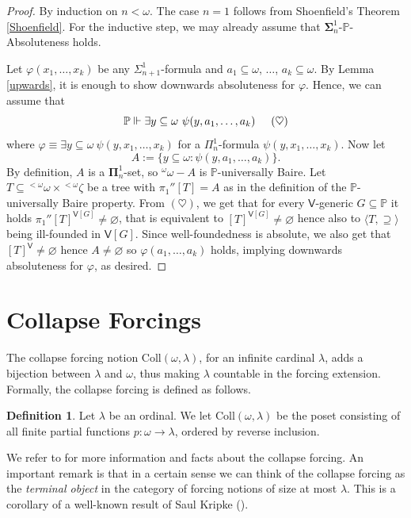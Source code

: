 \documentclass[10pt]{amsart}
\theoremstyle{definition}
\newtheorem{definition}[theorem]{Definition}
\begin{document}
\begin{proof}
By induction on $n<\omega$. The case $n=1$ follows from Shoenfield's Theorem \ref{Shoenfield}. For the inductive step, we may already assume that $\boldsymbol\Sigma^1_n$-$\mathbb P$-Absoluteness holds.\medskip

Let $\varphi(x_1,\ldots,x_k)$ be any $\Sigma^1_{n+1}$-formula and $a_1\subseteq\omega$, $\ldots$, $a_k\subseteq\omega$. By Lemma \ref{upwards}, it is enough to show downwards absoluteness for $\varphi$. Hence, we can assume that
\[\mathbb P\Vdash \exists y\subseteq\omega\ \psi(y,a_1,\ldots,a_k)\hspace{.5cm}(\heartsuit)\]
where $\varphi\equiv \exists y\subseteq\omega\ \psi(y,x_1,\ldots,x_k)$ for a $\Pi^1_n$-formula $\psi(y,x_1,\ldots,x_k)$. Now let
    \[A:=\{y\subseteq\omega: \psi(y,a_1,\ldots,a_k)\}.\]
    By definition, $A$ is a $\boldsymbol\Pi^1_n$-set, so ${}^\omega\omega-A$ is $\mathbb P$-universally Baire. Let $T\subseteq{}^{<\omega}\omega\times{}^{<\omega}\zeta$ be a tree with $\pi_1''[T]=A$ as in the definition of the $\mathbb P$-universally Baire property. From $(\heartsuit)$, we get that for every $\mathsf V$-generic $G\subseteq\mathbb P$ it holds $\pi_1''[T]^{\mathsf V[G]}\neq\varnothing$, that is equivalent to $[T]^{\mathsf V[G]}\neq\varnothing$ hence also to $\langle T,\supseteq\rangle$ being ill-founded in $\mathsf V[G]$. Since well-foundedness is absolute, we also get that $[T]^{\mathsf V}\neq\varnothing$ hence $A\neq\varnothing$ so $\varphi(a_1,\ldots,a_k)$ holds, implying downwards absoluteness for $\varphi$, as desired.
\end{proof}

\section{Collapse Forcings}\label{collapse}

The collapse forcing notion $\mathrm{Coll}(\omega,\lambda)$, for an infinite cardinal $\lambda$, adds a bijection between $\lambda$ and $\omega$, thus making $\lambda$ countable in the forcing extension. Formally, the collapse forcing is defined as follows.

\begin{definition}
    Let $\lambda$ be an ordinal. We let $\mathrm{Coll}(\omega,\lambda)$ be the poset consisting of all finite partial functions $p:\omega\to\lambda$, ordered by reverse inclusion.
\end{definition}

We refer to \cite[Section 15]{Jech} for more information and facts about the collapse forcing. An important remark is that in a certain sense we can think of the collapse forcing as the \emph{terminal object} in the category of forcing notions of size at most $\lambda$. This is a corollary of a well-known result of Saul Kripke (\cite{Kripke}).
\end{document}
